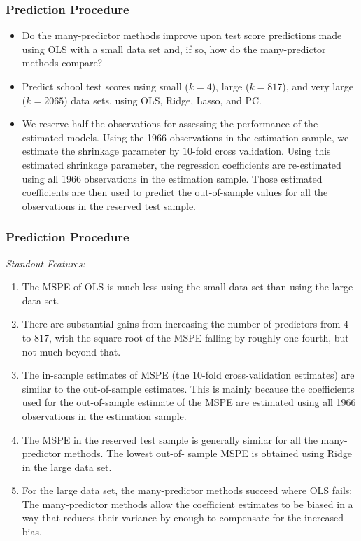 

\begin{frame}
\frametitle{Prediction Procedure}
\begin{itemize}
\item Do the many-predictor methods improve upon test score predictions made using OLS with a small data set and, if so, how do the many-predictor methods compare?
\item Predict school test scores using small ($k = 4$), large ($k = 817$), and very large ($k = 2065$) data sets, using OLS, Ridge, Lasso, and PC. 
\item We reserve half the observations for assessing the performance of the estimated models. Using the 1966 observations in the estimation sample, we estimate the shrinkage parameter by $10$-fold cross validation. Using this estimated shrinkage parameter, the regression coefficients are re-estimated using all 1966 observations in the estimation sample. Those estimated coefficients are then used to predict the out-of-sample values for all the observations in the reserved test sample.
\end{itemize}
\end{frame}

\begin{frame}
\frametitle{Prediction Procedure}
\emph{Standout Features:}
\begin{enumerate}
\item The MSPE of OLS is much less using the small data set than using the large data set.
\item There are substantial gains from increasing the number of predictors from $4$ to $817$, with the square root of the MSPE falling by roughly one-fourth, but not much beyond that.
\item The in-sample estimates of MSPE (the $10$-fold cross-validation estimates) are similar to the out-of-sample estimates. This is mainly because the coefficients used for the out-of-sample estimate of the MSPE are estimated using all 1966 observations in the estimation sample. 
\item The MSPE in the reserved test sample is generally similar for all the many-predictor methods. The lowest out-of- sample MSPE is obtained using Ridge in the large data set.
\item For the large data set, the many-predictor methods succeed where OLS fails: The many-predictor methods allow the coefficient estimates to be biased in a way that reduces their variance by enough to compensate for the increased bias.
\end{enumerate} 
\end{frame}


